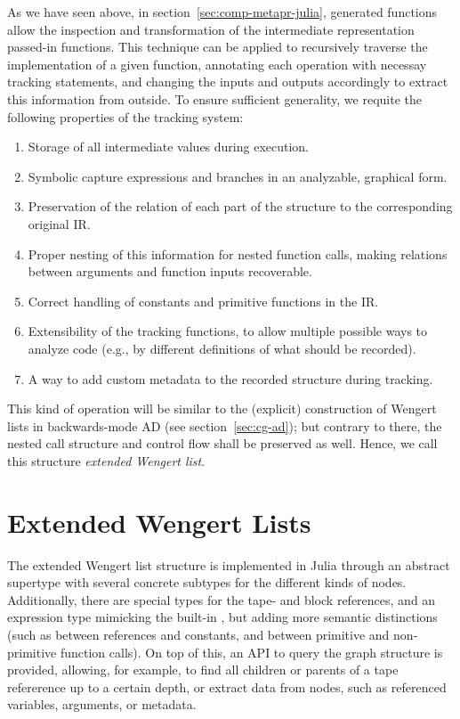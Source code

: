 As we have seen above, in section~\ref{sec:comp-metapr-julia}, generated functions allow the
inspection and transformation of the intermediate representation passed-in functions.  This
technique can be applied to recursively traverse the implementation of a given function, annotating
each operation with necessay tracking statements, and changing the inputs and outputs accordingly to
extract this information from outside.  To ensure sufficient generality, we requite the following
properties of the tracking system:
\begin{enumerate}
  \firmlist
\item Storage of all intermediate values during execution.
\item Symbolic capture expressions and branches in an analyzable, graphical form.
\item Preservation of the relation of each part of the structure to the corresponding original IR.
\item Proper nesting of this information for nested function calls, making relations between
  arguments and function inputs recoverable.
\item Correct handling of constants and primitive functions in the IR.
\item Extensibility of the tracking functions, to allow multiple possible ways to analyze code
  (e.g., by different definitions of what should be recorded).
\item A way to add custom metadata to the recorded structure during tracking.
\end{enumerate}
This kind of operation will be similar to the (explicit) construction of Wengert lists in
backwards-mode AD (see section~\ref{sec:cg-ad}); but contrary to there, the nested call structure
and control flow shall be preserved as well.  Hence, we call this structure \emph{extended Wengert
  list}.  

\section{Extended Wengert Lists}
\label{sec:exteded-wengert-lists}

The extended Wengert list structure is implemented in Julia through an abstract supertype with
several concrete subtypes for the different kinds of nodes.  Additionally, there are special types
for the tape- and block references, and an expression type mimicking the built-in , but
adding more semantic distinctions (such as between references and constants, and between primitive
and non-primitive function calls).  On top of this, an API to query the graph structure is provided,
allowing, for example, to find all children or parents of a tape refererence up to a certain depth,
or extract data from nodes, such as referenced variables, arguments, or metadata.

